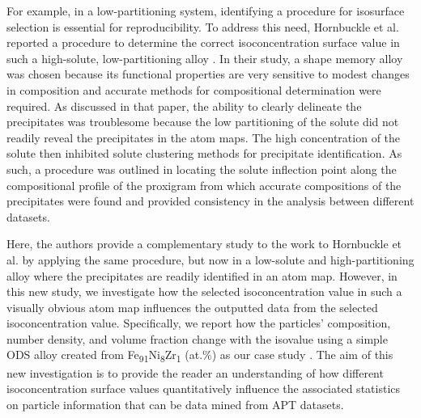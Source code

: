 	For example, in a low-partitioning system, identifying a procedure for isosurface selection is essential for reproducibility. To address this need, Hornbuckle et al. reported a procedure to determine the correct isoconcentration surface value in such a high-solute, low-partitioning alloy \cite{RN214}. In their study, a shape memory alloy was chosen because its functional properties are very sensitive to modest changes in composition and accurate methods for compositional determination were required. As discussed in that paper, the ability to clearly delineate the precipitates was troublesome because the low partitioning of the solute did not readily reveal the precipitates in the atom maps. The high concentration of the solute then inhibited solute clustering methods for precipitate identification. As such, a procedure was outlined in locating the solute inflection point along the compositional profile of the proxigram from which accurate compositions of the precipitates were found and provided consistency in the analysis between different datasets. 
	
	Here, the authors provide a complementary study to the work to Hornbuckle et al. \cite{RN214} by applying the same procedure, but now in a low-solute and high-partitioning alloy where the precipitates are readily identified in an atom map. However, in this new study, we investigate how the selected isoconcentration value in such a visually obvious atom map influences the outputted data from the selected isoconcentration value. Specifically, we report how the particles’ composition, number density, and volume fraction change with the isovalue using a simple ODS alloy created from Fe\textsubscript{91}Ni\textsubscript{8}Zr\textsubscript{1} (at.\%) as our case study \cite{RN267}. The aim of this new investigation is to provide the reader an understanding of how different isoconcentration surface values quantitatively influence the associated statistics on particle information that can be data mined from APT datasets.

